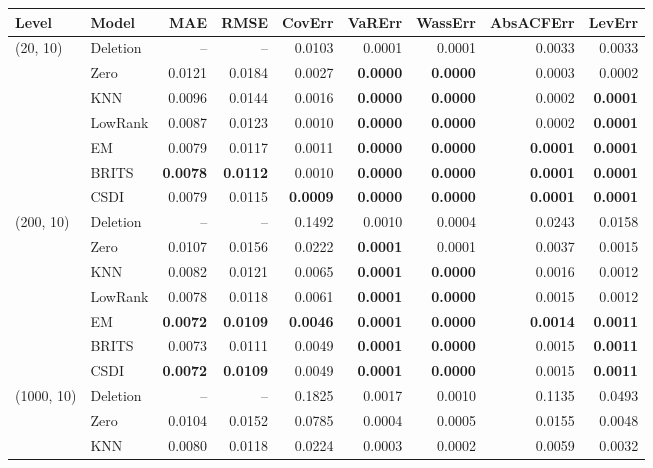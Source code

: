 {\fontsize{4.9}{5.5}\selectfont\setlength{\tabcolsep}{9pt}
\setlength{\aboverulesep}{0.25ex}\setlength{\belowrulesep}{0.4ex}
\begin{tabular}{@{}llrrrrrrr@{}}
\toprule
Level & Model & MAE & RMSE & CovErr & VaRErr & WassErr & AbsACFErr & LevErr \\
\midrule
(20, 10) & Deletion & -- & -- & 0.0103 & 0.0001 & 0.0001 & 0.0033 & 0.0033 \\
 & Zero & 0.0121 & 0.0184 & 0.0027 & \textbf{0.0000} & \textbf{0.0000} & 0.0003 & 0.0002 \\
 & KNN & 0.0096 & 0.0144 & 0.0016 & \textbf{0.0000} & \textbf{0.0000} & 0.0002 & \textbf{0.0001} \\
 & LowRank & 0.0087 & 0.0123 & 0.0010 & \textbf{0.0000} & \textbf{0.0000} & 0.0002 & \textbf{0.0001} \\
 & EM & 0.0079 & 0.0117 & 0.0011 & \textbf{0.0000} & \textbf{0.0000} & \textbf{0.0001} & \textbf{0.0001} \\
 & BRITS & \textbf{0.0078} & \textbf{0.0112} & 0.0010 & \textbf{0.0000} & \textbf{0.0000} & \textbf{0.0001} & \textbf{0.0001} \\
 & CSDI & 0.0079 & 0.0115 & \textbf{0.0009} & \textbf{0.0000} & \textbf{0.0000} & \textbf{0.0001} & \textbf{0.0001} \\
\midrule
(200, 10) & Deletion & -- & -- & 0.1492 & 0.0010 & 0.0004 & 0.0243 & 0.0158 \\
 & Zero & 0.0107 & 0.0156 & 0.0222 & \textbf{0.0001} & 0.0001 & 0.0037 & 0.0015 \\
 & KNN & 0.0082 & 0.0121 & 0.0065 & \textbf{0.0001} & \textbf{0.0000} & 0.0016 & 0.0012 \\
 & LowRank & 0.0078 & 0.0118 & 0.0061 & \textbf{0.0001} & \textbf{0.0000} & 0.0015 & 0.0012 \\
 & EM & \textbf{0.0072} & \textbf{0.0109} & \textbf{0.0046} & \textbf{0.0001} & \textbf{0.0000} & \textbf{0.0014} & \textbf{0.0011} \\
 & BRITS & 0.0073 & 0.0111 & 0.0049 & \textbf{0.0001} & \textbf{0.0000} & 0.0015 & \textbf{0.0011} \\
 & CSDI & \textbf{0.0072} & \textbf{0.0109} & 0.0049 & \textbf{0.0001} & \textbf{0.0000} & 0.0015 & \textbf{0.0011} \\
\midrule
(1000, 10) & Deletion & -- & -- & 0.1825 & 0.0017 & 0.0010 & 0.1135 & 0.0493 \\
 & Zero & 0.0104 & 0.0152 & 0.0785 & 0.0004 & 0.0005 & 0.0155 & 0.0048 \\
 & KNN & 0.0080 & 0.0118 & 0.0224 & 0.0003 & 0.0002 & 0.0059 & 0.0032 \\

\end{tabular}}
